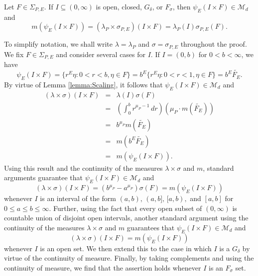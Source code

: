 \documentclass[smallextended]{svjour3}
\theoremstyle{remark}
\renewenvironment{proof}[1][\proofname]{\renewcommand\xproofname{#1}\xproof}{\endxproof}
\begin{document}
\begin{lemma}\label{lem:SpecialRectangle}
Let $F\in\Sigma_{P,E}$. If $I\subseteq (0,\infty)$ is open, closed, $G_\delta$, or $F_\sigma$, then $\psi_E(I\times F)\in\mathcal{M}_d$ and
\begin{equation}\label{eq:SpecialRectangle}
m(\psi_E(I\times F))=(\lambda_P\times\sigma_{P,E})(I\times F)=\lambda_P(I)\sigma_{P,E}(F).
\end{equation}
\end{lemma}
\begin{proof}
To simplify notation, we shall write $\lambda=\lambda_P$ and $\sigma=\sigma_{P,E}$ throughout the proof. We fix $F\in\Sigma_{P,E}$ and consider several cases for $I$. If $I=(0,b)$ for $0<b<\infty$, we have
\begin{equation*}
\psi_E(I\times F)=\{r^E\eta:0<r<b,\eta\in F\}=b^E\{r^E\eta:0<r<1,\eta \in F\}=b^E\widetilde{F_E}.
\end{equation*}
By virtue of Lemma \ref{lemma:Scaling}, it follows that $\psi_E(I\times F)\in\mathcal{M}_d$ and
\begin{eqnarray*}
(\lambda\times\sigma)(I\times F)&=&\lambda(I)\sigma(F)\\
&=&\left(\int_0^b r^{\mu_P-1}\,dr\right)\left(\mu_P\cdot m(\widetilde{F_E})\right)\\
&=&b^{\mu_P}m(\widetilde{F_E})\\
&=&m(b^{E}\widetilde{F_E})\\
&=&m(\psi_E(I\times F)).
\end{eqnarray*}
Using this result and the continuity of the measures $\lambda\times\sigma$ and $m$, standard arguments guarantee that $\psi_E(I\times F)\in\mathcal{M}_d$ and
\begin{equation*}
    (\lambda\times\sigma)(I\times F)=\left(b^{\mu_P}-a^{\mu_P}\right)\sigma(F)=m(\psi_E(I\times F))
\end{equation*}
whenever $I$ is an interval of the form $(a,b),\,(a,b],\,[a,b),$ and $[a,b]$ for $0\leq a\leq b\leq \infty$. Further, using the fact that every open subset of $(0,\infty)$ is countable union of disjoint open intervals, another standard argument using the continuity of the measures $\lambda\times \sigma$ and $m$ guarantees that $\psi_E(I\times F)\in\mathcal{M}_d$ and
\begin{equation*}
    (\lambda\times\sigma)(I\times F)=m(\psi_E(I\times F))
\end{equation*}
whenever $I$ is an open set. We then extend this to the case in which $I$ is a $G_\delta$ by virtue of the continuity of measure. Finally, by taking complements and using the continuity of measure, we find that the assertion holds whenever $I$ is an $F_\sigma$ set. 
\end{proof}
\end{document}
